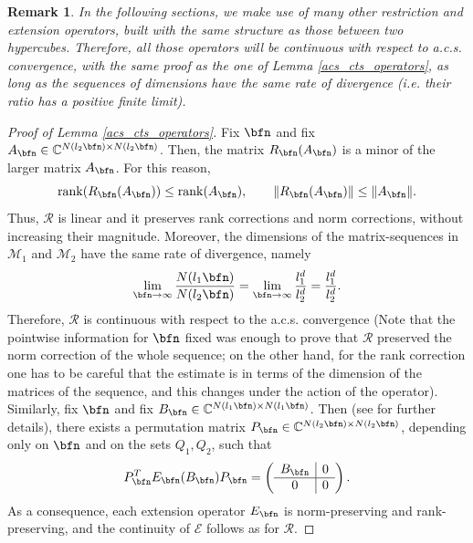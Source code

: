 \documentclass{amsart}
\newtheorem{rem}[thm]{Remark}
\begin{document}
\begin{rem}\label{acs_same_structure}
    In the following sections, we make use of many other restriction and extension operators, built with the same structure as those between two hypercubes. Therefore, all those operators will be continuous with respect to a.c.s. convergence, with the same proof as the one of Lemma \ref{acs_cts_operators}, as long as the sequences of dimensions have the same rate of divergence (i.e. their ratio has a positive finite limit). 
\end{rem}
\begin{proof}[Proof of Lemma \ref{acs_cts_operators}]
    Fix $\bfn$ and fix $A_\bfn\in\mathbb{C}^{N(l_2\bfn)\times N(l_2\bfn)}$. Then, the matrix $R_\bfn(A_\bfn)$ is a minor of the larger matrix $A_\bfn$. For this reason,
    \begin{equation*}
        \mathrm{rank}(R_\bfn(A_\bfn))\leq\mathrm{rank}(A_\bfn),\qquad \|R_\bfn(A_\bfn)\|\leq\|A_\bfn\|.
    \end{equation*}
    Thus, $\mathcal{R}$ is linear and it preserves rank corrections and norm corrections, without increasing their magnitude. Moreover, the dimensions of the matrix-sequences in $\mathcal{M}_1$ and $\mathcal{M}_2$ have the same rate of divergence, namely
    \begin{equation*}
        \lim\limits_{\bfn\to\infty}\frac{N(l_1\bfn)}{N(l_2\bfn)}=\lim\limits_{\bfn\to\infty}\frac{l_1^d}{l_2^d}=\frac{l_1^d}{l_2^d}.
    \end{equation*}
    Therefore, $\mathcal{R}$ is continuous with respect to the a.c.s. convergence (Note that the pointwise information for $\bfn$ fixed was enough to prove that $\mathcal{R}$ preserved the norm correction of the whole sequence; on the other hand, for the rank correction one has to be careful that the estimate is in terms of the dimension of the matrices of the sequence, and this changes under the action of the operator).
    Similarly, fix $\bfn$ and fix $B_\bfn\in\mathbb{C}^{N(l_1\bfn)\times N(l_1\bfn)}$.  Then (see \cite[Lemma 4.3]{Barb} for further details), there exists a permutation matrix $P_{\bfn}\in\mathbb{C}^{N(l_2\bfn)\times N(l_2\bfn)}$, depending only on $\bfn$ and on the sets $Q_1,Q_2$, such that
    \begin{equation*}
        P_{\bfn}^TE_\bfn(B_\bfn) P_{\bfn}=\left( 
    \begin{array}{c|c} 
      B_\bfn & 0 \\ 
      \hline 
      0 & 0 
    \end{array} 
    \right).
    \end{equation*}
    As a consequence, each extension operator $E_\bfn$ is norm-preserving and rank-preserving, and the continuity of $\mathcal{E}$ follows as for $\mathcal{R}$.
\end{proof}
\end{document}
